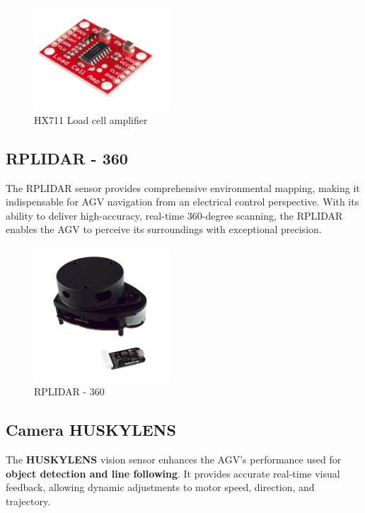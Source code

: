 \documentclass[../../main]{subfiles}
\begin{document}
\begin{figure}[H]
    \centering
    \includegraphics[width=0.45\textwidth]{fig/load_cell_amplifier.png}
    \caption{ HX711 Load cell amplifier }
    \label{HX711 Load cell amplifier} %
\end{figure}


\subsection{RPLIDAR - 360}

The RPLIDAR sensor provides comprehensive environmental mapping, making it indispensable for AGV navigation 
from an electrical control perspective. With its ability to deliver high-accuracy, real-time 360-degree
scanning, the RPLIDAR enables the AGV to perceive its surroundings with exceptional precision.

\begin{figure}[H]
    \centering
    \includegraphics[width=0.45\textwidth]{fig/lidar.png}
    \caption{ RPLIDAR - 360}
    \label{ RPLIDAR - 360 } %
\end{figure}


\subsection{Camera HUSKYLENS}

The \textbf{HUSKYLENS} vision sensor enhances the AGV’s performance 
used for \textbf{object detection and line following}. 
It provides accurate real-time visual feedback, allowing dynamic adjustments to 
motor speed, direction, and trajectory. 
\end{document}
